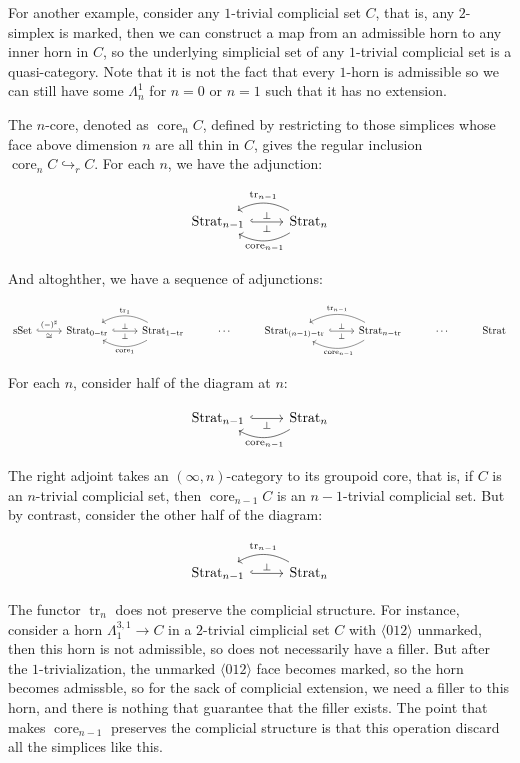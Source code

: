 \documentclass[11pt]{article}
\DeclareMathOperator{\Strat}{Strat}
\DeclareMathOperator{\sSet}{sSet}
\DeclareMathOperator{\tr}{tr}
\DeclareMathOperator{\core}{core}
\begin{document}
For another example, consider any $1$-trivial complicial set $C$, that is, any $2$-simplex is marked, then we can construct a map from an admissible horn to any inner horn in $C$, so the underlying simplicial set of any $1$-trivial complicial set is a quasi-category. Note that it is not the fact that every $1$-horn is admissible so we can still have some $\Lambda^1_n$ for $n=0$ or $n=1$ such that it has no extension.

The $n$-core, denoted as $\core_nC$, defined by restricting to those simplices whose face above dimension $n$ are all thin in $C$, gives the regular inclusion $\core_nC\hookrightarrow_r C$. For each $n$, we have the adjunction:

$$
	\begin{tikzcd}
	\Strat_{n-1} \arrow[r, hook, "\perp", "\perp" swap] & \Strat_n \arrow[l, bend left, "\core_{n-1}"] \arrow[l, bend right, "\tr_{n-1}" swap]
	\end{tikzcd}
$$

And altoghther, we have a sequence of adjunctions:


$$
\begin{tikzcd}
\sSet \arrow[r, hook, "\cong"  swap, "(-)^\sharp"]&
 \Strat_{0-\tr} \arrow[r, hook, "\perp", "\perp" swap] & 
 \Strat_{1-\tr} \arrow[l, bend left, "\core_{1}"] \arrow[l, bend right, "\tr_{1}" swap]& \cdots &
 \Strat_{(n-1)-\tr} \arrow[r, hook, "\perp", "\perp" swap]&
 \Strat_{n-\tr} \arrow[l, bend left, "\core_{n-1}"] \arrow[l, bend right, "\tr_{n-1}" swap] & \cdots &
 \Strat
\end{tikzcd}
$$


For each $n$, consider half of the diagram at $n$:

$$
\begin{tikzcd}
\Strat_{n-1} \arrow[r, hook, "\perp" swap] & \Strat_n \arrow[l, bend left, "\core_{n-1}"]
\end{tikzcd}
$$


The right adjoint takes an $(\infty,n)$-category to its groupoid core, that is, if $C$ is an $n$-trivial complicial set, then $\core_{n-1}C$ is an $n-1$-trivial complicial set. But by contrast, consider the other half of the diagram:

$$
\begin{tikzcd}
\Strat_{n-1} \arrow[r, hook, "\perp"] & \Strat_n \arrow[l, bend right, "\tr_{n-1}" swap]
\end{tikzcd}
$$

The functor $\tr_n$ does not preserve the complicial structure. For instance, consider a horn $\Lambda^{3,1}_1\to C$ in a $2$-trivial cimplicial set $C$ with $\langle 012\rangle$ unmarked, then this horn is not admissible, so does not necessarily have a filler. But after the $1$-trivialization, the unmarked $\langle 012\rangle$ face becomes marked, so the horn becomes admissble, so for the sack of complicial extension, we need a filler to this horn, and there is nothing that guarantee that the filler exists. The point that makes $\core_{n-1}$ preserves the complicial structure is that this operation discard all the simplices like this.
\end{document}
